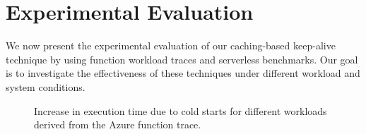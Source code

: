 \section{Experimental Evaluation}

\label{sec:eval}


We now present the experimental evaluation of our caching-based keep-alive technique by using function workload traces and serverless benchmarks.
Our goal is to investigate the effectiveness of these techniques under different workload and system conditions. 


\begin{figure}
  \centering
{}
  \hfill 
\hfill 
\caption{Increase in execution time due to cold starts for different workloads derived from the Azure function trace.}
\label{fig:exec-overheads-all}
\end{figure}


